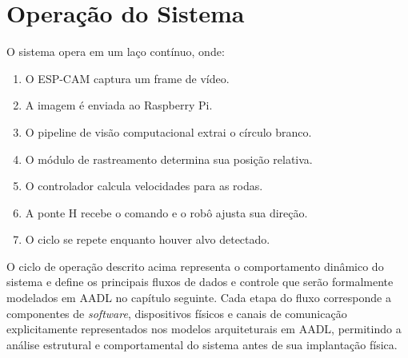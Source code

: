 \section{Operação do Sistema}
O sistema opera em um laço contínuo, onde:
\begin{enumerate}
    \item O ESP-CAM captura um frame de vídeo.
    \item A imagem é enviada ao Raspberry Pi.
    \item O pipeline de visão computacional extrai o círculo branco.
    \item O módulo de rastreamento determina sua posição relativa.
    \item O controlador calcula velocidades para as rodas.
    \item A ponte H recebe o comando e o robô ajusta sua direção.
    \item O ciclo se repete enquanto houver alvo detectado.
\end{enumerate}

O ciclo de operação descrito acima representa o comportamento dinâmico do sistema e define os principais fluxos de dados e controle que serão formalmente modelados em AADL no capítulo seguinte. Cada etapa do fluxo corresponde a componentes de \textit{software}, dispositivos físicos e canais de comunicação explicitamente representados nos modelos arquiteturais em AADL, permitindo a análise estrutural e comportamental do sistema antes de sua implantação física.
